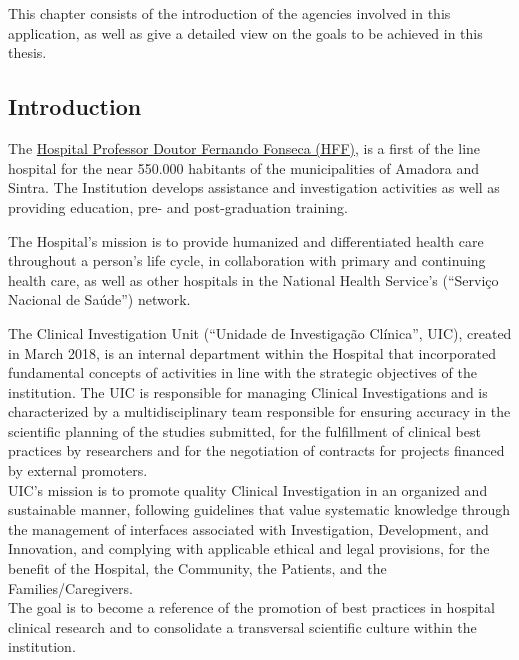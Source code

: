 \chapter{}\label{c2}
This chapter consists of the introduction of the agencies involved in
this application, as well as give a detailed view on the goals to be
achieved in this thesis.

\section{Introduction}\label{c2-s1-intro}
The \href{https://hff.min-saude.pt/}{Hospital Professor Doutor Fernando Fonseca (HFF)}, is a first of the line hospital for the near 550.000 habitants of the municipalities of Amadora and Sintra. The Institution develops assistance and investigation activities as well as providing education, pre- and post-graduation training.

The Hospital's mission is to provide humanized and differentiated health
care throughout a person's life cycle, in collaboration with primary and
continuing health care, as well as other hospitals in the National
Health Service's (``Serviço Nacional de Saúde'') network.

The Clinical Investigation Unit (``Unidade de Investigação Clínica'',
UIC), created in March 2018, is an internal department within the
Hospital that incorporated fundamental concepts of activities in line
with the strategic objectives of the institution. The UIC is responsible
for managing Clinical Investigations and is characterized by a
multidisciplinary team responsible for ensuring accuracy in the
scientific planning of the studies submitted, for the fulfillment of
clinical best practices by researchers and for the negotiation of
contracts for projects financed by external promoters.\\
UIC's mission is to promote quality Clinical Investigation in an
organized and sustainable manner, following guidelines that value
systematic knowledge through the management of interfaces associated
with Investigation, Development, and Innovation, and complying with
applicable ethical and legal provisions, for the benefit of the
Hospital, the Community, the Patients, and the Families/Caregivers.\\
The goal is to become a reference of the promotion of best practices in
hospital clinical research and to consolidate a transversal scientific
culture within the institution.

